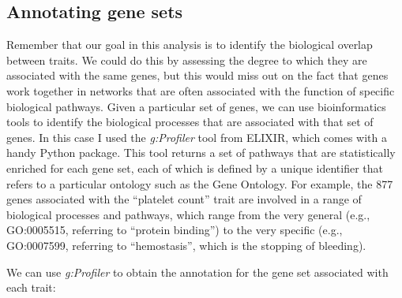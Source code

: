 \subsection{Annotating gene sets}

Remember that our goal in this analysis is to identify the biological overlap between traits. We could do this by assessing the degree to which they are associated with the same genes, but this would miss out on the fact that genes work together in networks that are often associated with the function of specific biological pathways.  Given a particular set of genes, we can use bioinformatics tools to identify the biological processes that are associated with that set of genes. In this case I used the  \textit{g:Profiler} tool from ELIXIR, which comes with a handy Python package.   This tool returns a set of pathways that are statistically enriched for each gene set, each of which is defined by a unique identifier that refers to a particular ontology such as the Gene Ontology.   For example, the 877 genes associated with the ``platelet count'' trait are involved in a range of biological processes and pathways, which range from the very general (e.g., GO:0005515, referring to ``protein binding'') to the very specific (e.g., GO:0007599, referring to ``hemostasis'', which is the stopping of bleeding).

We can use \textit{g:Profiler} to obtain the annotation for the gene set associated with each trait:

